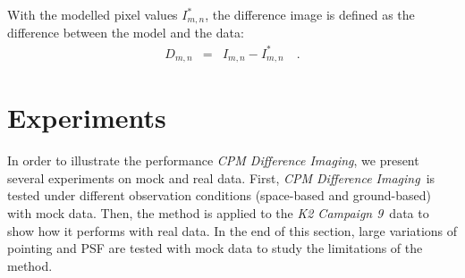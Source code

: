 \documentclass[12pt, preprint]{aastex}
\newcommand{\project}[1]{\textsl{#1}}
\newcommand{\cpmdiff}{\project{CPM Difference Imaging}}
\newcommand{\KTCN}{\project{K2 Campaign 9}}
\begin{document}
With the modelled pixel values $I^{\ast}_{m,n}$, the difference image is defined as the difference between the model and the data:
\begin{eqnarray}
D_{m,n} &=& I_{m,n} - I^{\ast}_{m,n}
\quad.
\end{eqnarray}

\section{Experiments}
In order to illustrate the performance \cpmdiff, we present several experiments on mock and real data. 
First, \cpmdiff\ is tested under different observation conditions (space-based and ground-based) with mock data. 
Then,  the method is applied to the \KTCN\ data to show how it performs with real data. 
In the end of this section,  large variations of pointing and PSF are tested with mock data to study the limitations of the method.
\end{document}
